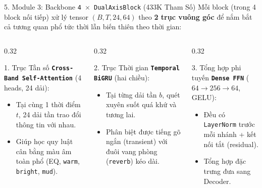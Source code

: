 \documentclass[aspectratio=169,10pt]{beamer}
\begin{document}
\begin{frame}{5. Module 3: Backbone \texttt{4 $\times$ DualAxisBlock} (433K Tham Số)}
  \footnotesize
  Mỗi block (trong 4 block nối tiếp) xử lý tensor $(B, T, 24, 64)$ theo \textbf{2 trục vuông góc} để nắm bắt cả tương quan phổ tức thời lẫn biến thiên theo thời gian:
  \vspace{0.3em}
  \begin{columns}[T]
    \begin{column}{0.32\textwidth}
      \begin{block}{1. Trục Tần số}
        \textbf{\texttt{Cross-Band Self-Attention}} (4 heads, 24 dải):
        \begin{itemize}
          \item Tại cùng 1 thời điểm $t$, 24 dải tần trao đổi thông tin với nhau.
          \item Giúp học quy luật cân bằng màu âm toàn phổ (EQ, \texttt{warm}, \texttt{bright}, \texttt{mud}).
        \end{itemize}
      \end{block}
    \end{column}
    \begin{column}{0.32\textwidth}
      \begin{exampleblock}{2. Trục Thời gian}
        \textbf{\texttt{Temporal BiGRU}} (hai chiều):
        \begin{itemize}
          \item Tại từng dải tần $b$, quét xuyên suốt quá khứ và tương lai.
          \item Phân biệt được tiếng gõ ngắn (transient) với đuôi vang phòng (\texttt{reverb}) kéo dài.
        \end{itemize}
      \end{exampleblock}
    \end{column}
    \begin{column}{0.32\textwidth}
      \begin{block}{3. Tổng hợp phi tuyến}
        \textbf{\texttt{Dense FFN}} ($64 \rightarrow 256 \rightarrow 64$, GELU):
        \begin{itemize}
          \item Đều có \texttt{LayerNorm} trước mỗi nhánh + kết nối tắt (residual).
          \item Tổng hợp đặc trưng đưa sang Decoder.
        \end{itemize}
      \end{block}
    \end{column}
  \end{columns}
\end{frame}
\end{document}
